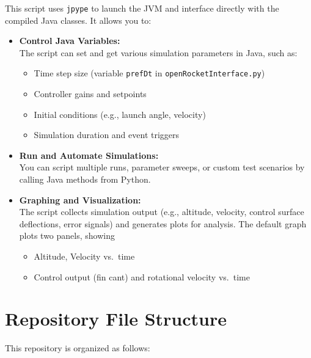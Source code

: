 \documentclass{amsdtx}
\providecommand{\tightlist}{%
  \setlength{\itemsep}{0pt}\setlength{\parskip}{0pt}}
\begin{document}
This script uses \texttt{jpype} to launch the JVM and interface directly
with the compiled Java classes. It allows you to:

\begin{itemize}
\item
  \textbf{Control Java Variables:}\\
  The script can set and get various simulation parameters in Java, such
  as:

  \begin{itemize}
  \tightlist
  \item
    Time step size (variable \texttt{prefDt} in
    \texttt{openRocketInterface.py})
  \item
    Controller gains and setpoints
  \item
    Initial conditions (e.g., launch angle, velocity)
  \item
    Simulation duration and event triggers
  \end{itemize}
\item
  \textbf{Run and Automate Simulations:}\\
  You can script multiple runs, parameter sweeps, or custom test
  scenarios by calling Java methods from Python.
\item
  \textbf{Graphing and Visualization:}\\
  The script collects simulation output (e.g., altitude, velocity,
  control surface deflections, error signals) and generates plots for
  analysis. The default graph plots two panels, showing

  \begin{itemize}
  \tightlist
  \item
    Altitude, Velocity vs.~time
  \item
    Control output (fin cant) and rotational velocity vs.~time
  \end{itemize}
\end{itemize}

\section{Repository File Structure}\label{repository-file-structure}

This repository is organized as follows:
\end{document}
